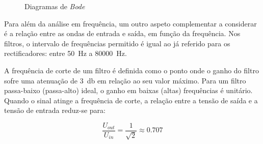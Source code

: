 \begin{figure}[hbtp]
	\centering%
		\centering
		\qquad
		\caption{Diagramas de \textit{Bode}  \cite{sedrasmith}}%
		\label{fig:Bodeesqgeral}%
\end{figure}

	Para além da análise em frequência, um outro aspeto complementar a considerar é a relação entre as ondas de entrada e saída, em função da frequência. Nos filtros, o intervalo de frequências permitido é igual ao já referido para os rectificadores: entre \SI{50}{\hertz} a \SI{80000}{\hertz}. 
	
	A frequência de corte de um filtro é definida como o ponto onde o ganho do filtro sofre uma atenuação de \SI{3}{\decibel} em relação ao seu valor máximo. 	Para um filtro passa-baixo (passa-alto) ideal, o ganho em baixas (altas) frequências é unitário. Quando o sinal atinge a frequência de corte, a relação entre a tensão de saída e a tensão de entrada reduz-se para:  
	
	\begin{equation} \label{eq:relacaoGanho}
		\frac{U_{out}}{U_{in}} = \frac{1}{\sqrt{2}} \approx 0.707
	\end{equation}
	
